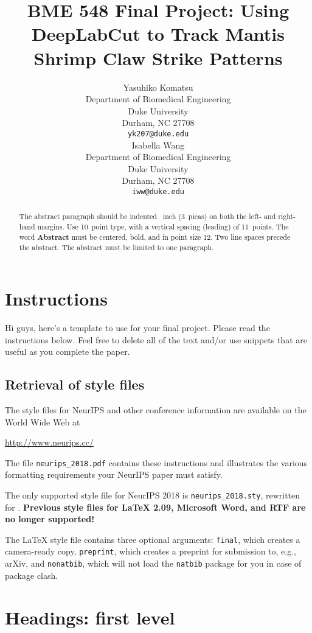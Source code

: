 \documentclass{article}
\title{BME 548 Final Project: Using DeepLabCut to Track Mantis Shrimp Claw Strike Patterns}
\author{%
  Yasuhiko Komatsu \\
  Department of Biomedical Engineering \\
  Duke University \\
  Durham, NC 27708\\
  \texttt{yk207@duke.edu} \\
  \And
  Isabella Wang\\
  Department of Biomedical Engineering\\
  Duke University\\
  Durham, NC 27708 \\
  \texttt{iww@duke.edu} \\
}
\begin{document}

\maketitle

\begin{abstract}
  The abstract paragraph should be indented ~inch (3~picas) on
  both the left- and right-hand margins. Use 10~point type, with a vertical
  spacing (leading) of 11~points.  The word \textbf{Abstract} must be centered,
  bold, and in point size 12. Two line spaces precede the abstract. The abstract
  must be limited to one paragraph.
\end{abstract}

\section{Instructions}

Hi guys, here's a template to use for your final project. Please read the instructions below. Feel free to delete all of the text and/or use snippets that are useful as you complete the paper.


\subsection{Retrieval of style files}

The style files for NeurIPS and other conference information are available on
the World Wide Web at
\begin{center}
  \url{http://www.neurips.cc/}
\end{center}
The file \verb+neurips_2018.pdf+ contains these instructions and illustrates the
various formatting requirements your NeurIPS paper must satisfy.

The only supported style file for NeurIPS 2018 is \verb+neurips_2018.sty+,
rewritten for \LaTeXe{}.  \textbf{Previous style files for \LaTeX{} 2.09,
  Microsoft Word, and RTF are no longer supported!}

The \LaTeX{} style file contains three optional arguments: \verb+final+, which
creates a camera-ready copy, \verb+preprint+, which creates a preprint for
submission to, e.g., arXiv, and \verb+nonatbib+, which will not load the
\verb+natbib+ package for you in case of package clash.

\section{Headings: first level}
\label{headings}
\end{document}
